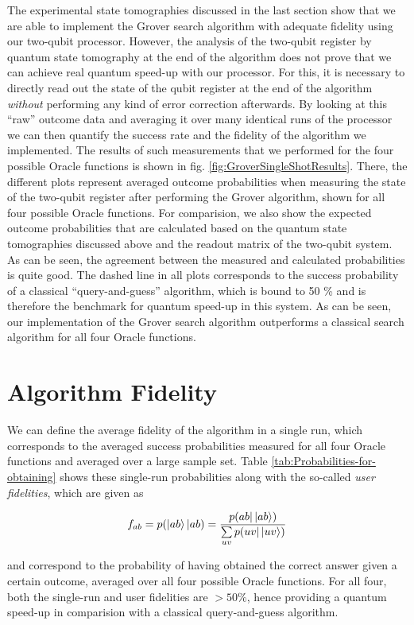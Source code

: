 The experimental state tomographies discussed in the last section show that we are able to implement the Grover search algorithm with adequate fidelity using our two-qubit processor. However, the analysis of the two-qubit register by quantum state tomography at the end of the algorithm does not prove that we can achieve real quantum speed-up with our processor. For this, it is necessary to directly read out the state of the qubit register at the end of the algorithm {\it without} performing any kind of error correction afterwards. By looking at this ``raw'' outcome data and averaging it over many identical runs of the processor we can then quantify the success rate and the fidelity of the algorithm we implemented. The results of such measurements that we performed for the four possible Oracle functions is shown in fig. \ref{fig:GroverSingleShotResults}. There, the different plots represent averaged outcome probabilities when measuring the state of the two-qubit register after performing the Grover algorithm, shown for all four possible Oracle functions. For comparision, we also show the expected outcome probabilities that are calculated based on the quantum state tomographies discussed above and the readout matrix of the two-qubit system. As can be seen, the agreement between the measured and calculated probabilities is quite good. The dashed line in all plots corresponds to the success probability of a classical ``query-and-guess'' algorithm, which is bound to 50 \% and is therefore the benchmark for quantum speed-up in this system. As can be seen, our implementation of the Grover search algorithm outperforms a classical search algorithm for all four Oracle functions.

\section{Algorithm Fidelity}

We can define the average fidelity of the algorithm in a single run, which corresponds to the averaged success probabilities measured for all four Oracle functions and averaged over a large sample set. Table \ref{tab:Probabilities-for-obtaining} shows these single-run probabilities along with the so-called {\it user fidelities}, which are given as

\begin{equation}
f_{ab} = p(\left| ab \right>|ab) = \frac{p(ab |\left| ab \right>)}{\sum\limits_{uv}p(uv|\left| uv \right>)} 
\end{equation}

and correspond to the probability of having obtained the correct answer given a certain outcome, averaged over all four possible Oracle functions. For all four, both the single-run and user fidelities are $> 50 \%$, hence providing a quantum speed-up in comparision with a classical query-and-guess algorithm.

